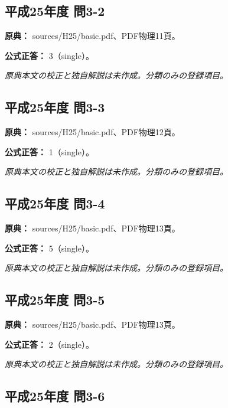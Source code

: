 \subsection{平成25年度 問3-2}
\label{q:h25-reg-basic-3-2}

\noindent\textbf{原典：} sources/H25/basic.pdf、PDF物理11頁。

\textbf{公式正答：} 3（single）。

\par\textit{原典本文の校正と独自解説は未作成。分類のみの登録項目。}

\subsection{平成25年度 問3-3}
\label{q:h25-reg-basic-3-3}

\noindent\textbf{原典：} sources/H25/basic.pdf、PDF物理12頁。

\textbf{公式正答：} 1（single）。

\par\textit{原典本文の校正と独自解説は未作成。分類のみの登録項目。}

\subsection{平成25年度 問3-4}
\label{q:h25-reg-basic-3-4}

\noindent\textbf{原典：} sources/H25/basic.pdf、PDF物理13頁。

\textbf{公式正答：} 5（single）。

\par\textit{原典本文の校正と独自解説は未作成。分類のみの登録項目。}

\subsection{平成25年度 問3-5}
\label{q:h25-reg-basic-3-5}

\noindent\textbf{原典：} sources/H25/basic.pdf、PDF物理13頁。

\textbf{公式正答：} 2（single）。

\par\textit{原典本文の校正と独自解説は未作成。分類のみの登録項目。}

\subsection{平成25年度 問3-6}
\label{q:h25-reg-basic-3-6}

